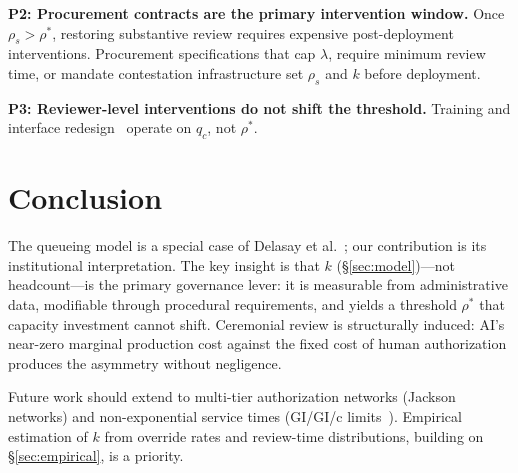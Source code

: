 \documentclass[runningheads]{llncs}
\begin{document}
\smallskip\noindent\textbf{P2: Procurement contracts are the primary intervention window.}
Once $\rho_s > \rho^*$, restoring substantive review requires expensive post-deployment
interventions. Procurement specifications that cap $\lambda$, require minimum review time,
or mandate contestation infrastructure set $\rho_s$ and $k$ before deployment.

\smallskip\noindent\textbf{P3: Reviewer-level interventions do not shift the threshold.}
Training and interface redesign~\cite{parasuraman1997} operate on $q_c$, not $\rho^*$.

\section{Conclusion}
\label{sec:conclusion}

The queueing model is a special case of Delasay et al.~\cite{delasay2016};
our contribution is its institutional interpretation. The key insight is that
$k$ (\S\ref{sec:model})---not headcount---is the primary governance lever:
it is measurable from administrative data, modifiable through procedural
requirements, and yields a threshold $\rho^*$ that capacity investment cannot
shift. Ceremonial review is structurally induced: AI's near-zero marginal
production cost against the fixed cost of human authorization produces the
asymmetry without negligence.

Future work should extend to multi-tier authorization networks (Jackson networks)
and non-exponential service times (GI/GI/c limits~\cite{whitt2002}). Empirical
estimation of $k$ from override rates and review-time distributions, building on
\S\ref{sec:empirical}, is a priority.




\end{document}
